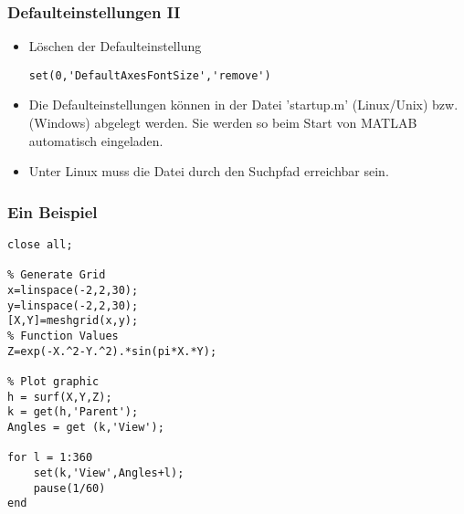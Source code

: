 \begin{frame}[fragile]\frametitle{Defaulteinstellungen II}
\begin{itemize}
\item L\"oschen der Defaulteinstellung
\begin{lstlisting}
set(0,'DefaultAxesFontSize','remove')
\end{lstlisting}
\item Die Defaulteinstellungen k\"onnen in der Datei 'startup.m'  (Linux/Unix)
  bzw.  (Windows) abgelegt werden. Sie werden so
  beim Start von MATLAB automatisch eingeladen. 
\item Unter Linux muss die Datei durch den Suchpfad  erreichbar
  sein.  
\end{itemize} 
\end{frame}
\begin{frame}[fragile]\frametitle{Ein Beispiel}
\begin{lstlisting}
close all;

% Generate Grid
x=linspace(-2,2,30);
y=linspace(-2,2,30);
[X,Y]=meshgrid(x,y);
% Function Values
Z=exp(-X.^2-Y.^2).*sin(pi*X.*Y);

% Plot graphic
h = surf(X,Y,Z);
k = get(h,'Parent'); 
Angles = get (k,'View');

for l = 1:360
    set(k,'View',Angles+l);
    pause(1/60)
end
\end{lstlisting}
\end{frame}
%
%
%
%
